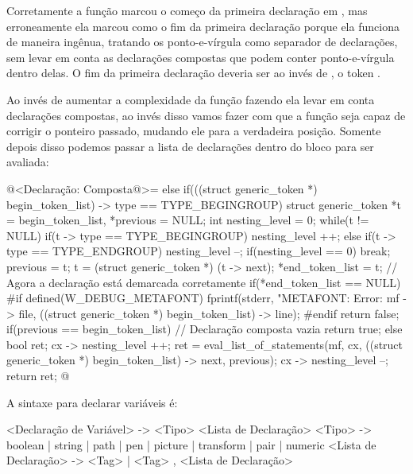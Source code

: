 \alinhaverbatim
[begingroup][T1][T2][;][T3][T4][;][endgroup][;]
\alinhanormal

Corretamente a função marcou o começo da primeira declaração
em , mas erroneamente ela
marcou  como o fim da primeira declaração porque ela
funciona de maneira ingênua, tratando os ponto-e-vírgula como
separador de declarações, sem levar em conta as declarações compostas
que podem conter ponto-e-vírgula dentro delas. O fim da primeira
declaração deveria ser ao invés de , o
token .

Ao invés de aumentar a complexidade da
função  fazendo ela levar em
conta declarações compostas, ao invés disso vamos fazer com que a
função  seja capaz de corrigir o ponteiro
passado, mudando ele para a verdadeira posição. Somente depois disso
podemos passar a lista de declarações dentro do bloco para ser
avaliada:

\iniciocodigo
@<Declaração: Composta@>=
else if(((struct generic_token *) begin_token_list) -> type ==
        TYPE_BEGINGROUP){
  struct generic_token *t = begin_token_list, *previous = NULL;
  int nesting_level = 0;
  while(t != NULL){
    if(t -> type == TYPE_BEGINGROUP)
      nesting_level ++;
    else if(t -> type == TYPE_ENDGROUP){
      nesting_level --;
      if(nesting_level == 0)
        break;
    }
    previous = t;
    t = (struct generic_token *) (t -> next);
  }
  *end_token_list = t; // Agora a declaração está demarcada corretamente
  if(*end_token_list == NULL){
#if defined(W_DEBUG_METAFONT)
    fprintf(stderr, "METAFONT: Error: %
            mf -> file,
            ((struct generic_token *) begin_token_list) -> line);
#endif
    return false;
  }
  if(previous == begin_token_list) // Declaração composta vazia
    return true;
  else{
    bool ret;
    cx -> nesting_level ++;
    ret = eval_list_of_statements(mf, cx, ((struct generic_token *)
                                         begin_token_list) -> next,
                                  previous);
    cx -> nesting_level --;
    return ret;
  }
}
@
\fimcodigo


A sintaxe para declarar variáveis é:

\alinhaverbatim
<Declaração de Variável> -> <Tipo> <Lista de Declaração>
<Tipo> -> boolean | string | path | pen | picture | transform | pair |
          numeric
<Lista de Declaração> -> <Tag> | <Tag> , <Lista de Declaração>
\alinhanormal

